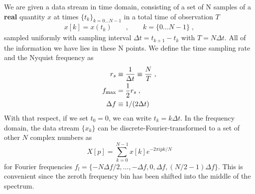 \documentclass[%
 reprint,
superscriptaddress,
nofootinbib,
 amsmath,amssymb,
 aps,
colorlinks = true, 
linkcolor = blue, 
urlcolor = blue, 
citecolor = blue, 
anchorcolor = blue,
]{revtex4-2}
\begin{document}
We are given a data stream in time domain, consisting of a set of N samples of a \textbf{real} quantity $x$ at times $\{t_k\}_{k=0\dots N-1}$ in a total time of observation $T$
\begin{align}\label{st_definition}
x[k]=x(t_k)\qquad,\qquad k=\{0\dots N-1\}\;,
\end{align}
sampled uniformly with sampling interval $\Delta t = t_{k+1} - t_{k}$ with $T = N\Delta t$. All of the information we have lies in these N points. We define the time sampling rate and the Nyquist frequency as
\begin{align}
r_s&\equiv\frac{1}{\Delta t}\equiv\frac{N}{T}\;,\nonumber\\
f_{\rm max}&=\frac 1 2r_s\;,\nonumber\\
\Delta f &\equiv 1/(2\Delta t)
\end{align}
With that respect, if we set $t_0=0$, we can write $t_k=k\Delta t$. 
In the frequency domain, the data stream $\{x_k\}$ can be discrete-Fourier-transformed to a set of other $N$ complex numbers as
%
\begin{equation}
\label{eq:dft-definition}
X[p] = \sum_{k = 0}^{N-1} x[k]e^{-2\pi i p k/N} %
\end{equation}
%
for Fourier frequencies $f_{l} = \{-N\Delta f/2, \ldots, -\Delta f, 0, \Delta f, (N/2 - 1)\Delta f\}$. This is convenient since the zeroth frequency bin has been shifted into the middle of the spectrum.

\end{document}
